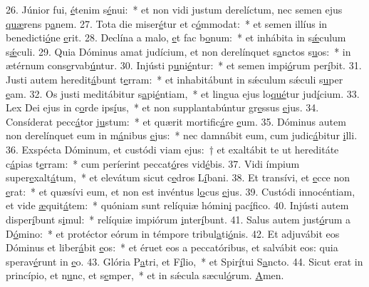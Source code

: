 26. Júnior fui, \uline{é}tenim s\uline{é}nui:~* et non vidi justum derelíctum, nec semen ejus \uline{quæ}rens p\uline{a}nem.
27. Tota die miser\uline{é}tur et c\uline{ó}mmodat:~* et semen illíus in benedicti\uline{ó}ne \uline{e}rit.
28. Declína a malo, \uline{e}t fac b\uline{o}num:~* et inhábita in s\uline{ǽ}culum s\uline{ǽ}culi.
29. Quia Dóminus amat judícium, et non derelínquet s\uline{a}nctos s\uline{u}os:~* in ætérnum cons\uline{e}rvab\uline{ú}ntur.
30. Injústi p\uline{u}ni\uline{é}ntur:~* et semen impi\uline{ó}rum per\uline{í}bit.
31. Justi autem heredit\uline{á}bunt t\uline{e}rram:~* et inhabitábunt in sǽculum sǽculi s\uline{u}per \uline{e}am.
32. Os justi meditábitur s\uline{a}pi\uline{é}ntiam,~* et lingua ejus lo\uline{qué}tur jud\uline{í}cium.
33. Lex Dei ejus in c\uline{o}rde ips\uline{í}us,~* et non supplantabúntur gr\uline{e}ssus \uline{e}jus.
34. Consíderat pecc\uline{á}tor j\uline{u}stum:~* et quærit mortific\uline{á}re \uline{e}um.
35. Dóminus autem non derelínquet eum in m\uline{á}nibus \uline{e}jus:~* nec damnábit eum, cum judic\uline{á}bitur \uline{i}lli.
36. Exspécta Dóminum, et custódi viam ejus:~† et exaltábit te ut hereditáte c\uline{á}pias t\uline{e}rram:~* cum períerint peccat\uline{ó}res vid\uline{é}bis.
37. Vidi ímpium super\uline{e}xalt\uline{á}tum,~* et elevátum sicut c\uline{e}dros L\uline{í}bani.
38. Et transívi, et \uline{e}cce non \uline{e}rat:~* et quæsívi eum, et non est invéntus l\uline{o}cus \uline{e}jus.
39. Custódi innocéntiam, et vide \uline{æ}quit\uline{á}tem:~* quóniam sunt relíquiæ hómin\uline{i} pac\uline{í}fico.
40. Injústi autem disper\uline{í}bunt s\uline{i}mul:~* relíquiæ impiórum \uline{i}nter\uline{í}bunt.
41. Salus autem just\uline{ó}rum a D\uline{ó}mino:~* et protéctor eórum in témpore tribul\uline{a}ti\uline{ó}nis.
42. Et adjuvábit eos Dóminus et liber\uline{á}bit \uline{e}os:~* et éruet eos a peccatóribus, et salvábit eos: quia sperav\uline{é}runt in \uline{e}o.
43. Glória P\uline{a}tri, et F\uline{í}lio,~* et Spir\uline{í}tui S\uline{a}ncto.
44. Sicut erat in princípio, et n\uline{u}nc, et s\uline{e}mper,~* et in sǽcula sæcul\uline{ó}rum. \uline{A}men.
